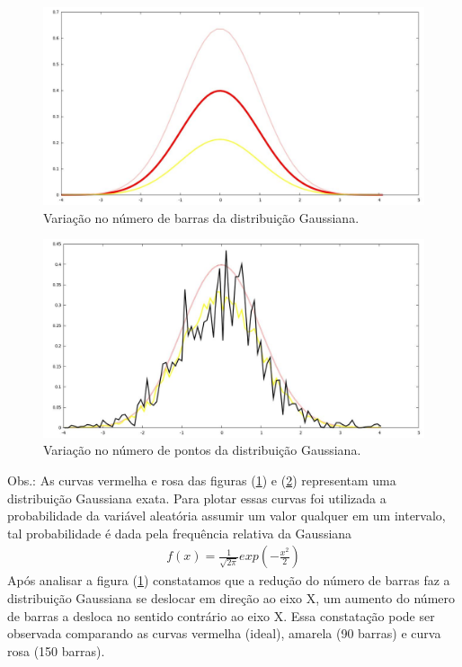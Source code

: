 \begin{figure}[!htb]
\centering
\begin{minipage}[b]{0.9\linewidth}
\includegraphics[width=\linewidth]{./img/Distribuicoes/GauVarBar.jpg}
\caption{Variação no número de barras da distribuição Gaussiana.}
\label{figGaussianaBar}
\end{minipage} \hfill
\end{figure}

\begin{figure}[!htb]
\centering
\begin{minipage}[b]{0.9\linewidth}
\includegraphics[width=\linewidth]{./img/Distribuicoes/GauVarPt.jpg}
\caption{Variação no número de pontos da distribuição Gaussiana.}
\label{figGaussianaPt}
\end{minipage} \hfill
\end{figure}

Obs.: As curvas vermelha e rosa das figuras (\ref{figGaussianaBar}) e (\ref{figGaussianaPt}) representam uma distribuição Gaussiana exata. Para plotar essas curvas foi utilizada a probabilidade da variável aleatória assumir um valor qualquer em um intervalo, tal probabilidade é dada pela frequência relativa da Gaussiana
\begin{eqnarray}
f(x) = \frac{1}{\sqrt{2 \pi}}exp(-\frac{x^{2}}{2})
\end{eqnarray}
Após analisar a figura (\ref{figGaussianaBar}) constatamos que a redução do número de barras faz a distribuição Gaussiana se deslocar em direção ao eixo X, um aumento do número de barras a desloca no sentido contrário ao eixo X. Essa constatação pode ser observada comparando as curvas vermelha (ideal), amarela (90 barras) e curva rosa (150 barras).
 
